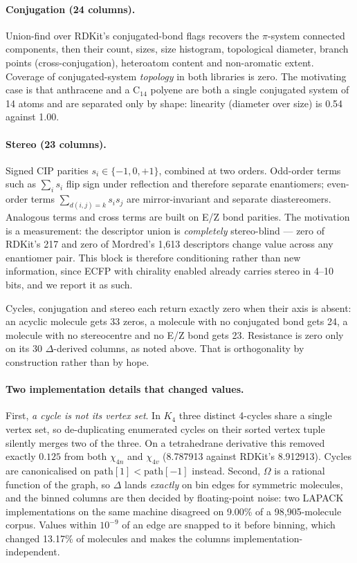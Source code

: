 \paragraph{Conjugation (24 columns).} Union-find over RDKit's conjugated-bond flags recovers the
$\pi$-system connected components, then their count, sizes, size histogram, topological
diameter, branch points (cross-conjugation), heteroatom content and non-aromatic extent.
Coverage of conjugated-system \emph{topology} in both libraries is zero. The motivating case is
that anthracene and a C$_{14}$ polyene are both a single conjugated system of 14 atoms and are
separated only by shape: linearity (diameter over size) is 0.54 against 1.00.

\paragraph{Stereo (23 columns).} Signed CIP parities $s_i \in \{-1,0,+1\}$, combined at two
orders. Odd-order terms such as $\sum_i s_i$ flip sign under reflection and therefore separate
enantiomers; even-order terms $\sum_{d(i,j)=k} s_i s_j$ are mirror-invariant and separate
diastereomers. Analogous terms and cross terms are built on E/Z bond parities. The motivation
is a measurement: the descriptor union is \emph{completely} stereo-blind --- zero of RDKit's 217
and zero of Mordred's 1{,}613 descriptors change value across any enantiomer pair. This block is
therefore conditioning rather than new information, since ECFP with chirality enabled already
carries stereo in 4--10 bits, and we report it as such.

Cycles, conjugation and stereo each return exactly zero when their axis is absent: an acyclic
molecule gets 33 zeros, a molecule with no conjugated bond gets 24, a molecule with no
stereocentre and no E/Z bond gets 23. Resistance is zero only on its 30 $\Delta$-derived
columns, as noted above. That is orthogonality by construction rather than by hope.

\paragraph{Two implementation details that changed values.} First, \emph{a cycle is not its
vertex set}. In $K_4$ three distinct 4-cycles share a single vertex set, so de-duplicating
enumerated cycles on their sorted vertex tuple silently merges two of the three. On a
tetrahedrane derivative this removed exactly $0.125$ from both $\chi_{4n}$ and $\chi_{4v}$
(8.787913 against RDKit's 8.912913). Cycles are canonicalised on
$\mathrm{path}[1] < \mathrm{path}[-1]$ instead. Second, $\Omega$ is a rational function of the
graph, so $\Delta$ lands \emph{exactly} on bin edges for symmetric molecules, and the binned
columns are then decided by floating-point noise: two LAPACK implementations on the same machine
disagreed on 9.00\% of a 98{,}905-molecule corpus. Values within $10^{-9}$ of an edge are snapped
to it before binning, which changed 13.17\% of molecules and makes the columns
implementation-independent.

